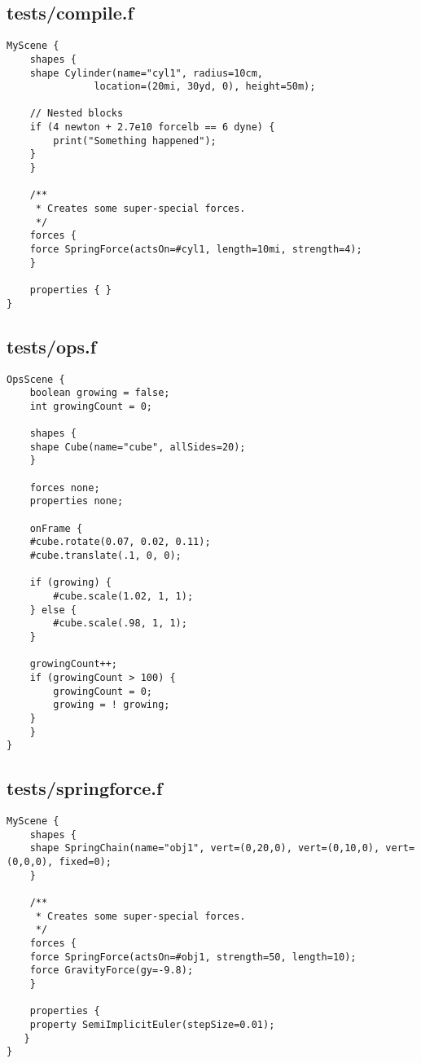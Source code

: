 \subsection*{tests/compile.f}
\begin{lstlisting}
MyScene {
    shapes {
	shape Cylinder(name="cyl1", radius=10cm, 
		       location=(20mi, 30yd, 0), height=50m);

	// Nested blocks
	if (4 newton + 2.7e10 forcelb == 6 dyne) {
	    print("Something happened");
	}
    }

    /**
     * Creates some super-special forces.
     */
    forces {
	force SpringForce(actsOn=#cyl1, length=10mi, strength=4);
    }

    properties { }
}
\end{lstlisting}

\subsection*{tests/ops.f}
\begin{lstlisting}
OpsScene {
    boolean growing = false;
    int growingCount = 0;

    shapes {
	shape Cube(name="cube", allSides=20);
    }

    forces none;
    properties none;

    onFrame {
	#cube.rotate(0.07, 0.02, 0.11);
	#cube.translate(.1, 0, 0);

	if (growing) {
	    #cube.scale(1.02, 1, 1);
	} else {
	    #cube.scale(.98, 1, 1);
	}

	growingCount++;
	if (growingCount > 100) {
	    growingCount = 0;
	    growing = ! growing;
	}
    }
}\end{lstlisting}

\subsection*{tests/springforce.f}
\begin{lstlisting}
MyScene {
    shapes {
	shape SpringChain(name="obj1", vert=(0,20,0), vert=(0,10,0), vert=(0,0,0), fixed=0);
    }

    /**
     * Creates some super-special forces.
     */
    forces {
	force SpringForce(actsOn=#obj1, strength=50, length=10);
	force GravityForce(gy=-9.8);
    }

    properties { 
	property SemiImplicitEuler(stepSize=0.01);
   }
}
\end{lstlisting}

